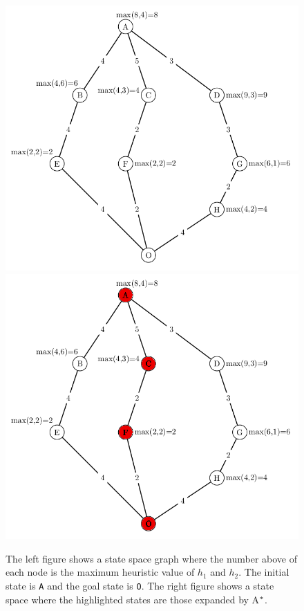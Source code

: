 \begin{figure}[!htb]
  \includegraphics[width=\linewidth]{images/marvinmaxfull-left}
\endminipage\hfill
{}
  \includegraphics[width=\linewidth]{images/marvinmaxfullacfG-right}
\endminipage
\caption{The left figure shows a state space graph where the number above of each node is the maximum heuristic value of $h_{1}$ and $h_{2}$. The initial state is \texttt{A} and the goal state is \texttt{O}. The right figure shows a state space where the highlighted states are those expanded by A$\sp{*}$. }\label{fig:image_maxh1h2_astar}
\end{figure}


